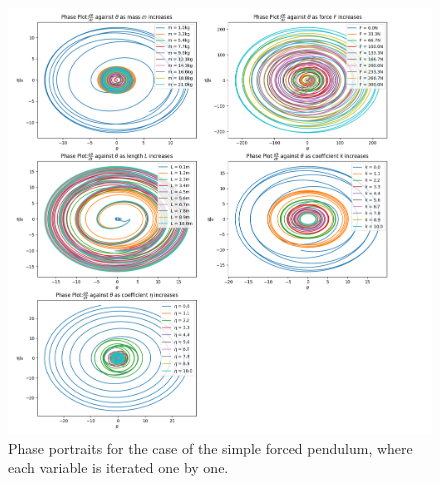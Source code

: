 \documentclass[10pt, twocolumn]{article}
\begin{document}
\begin{figure}
    \centering
    \includegraphics[width = 1.1\columnwidth]{Projects/ForcedSimplePendulum/Plots/test_plots_phase.png}
    \caption{Phase portraits for the case of the simple forced pendulum, where each variable is iterated one by one.}
    \label{phase portrait test}
\end{figure}

\twocolumn
\end{document}
